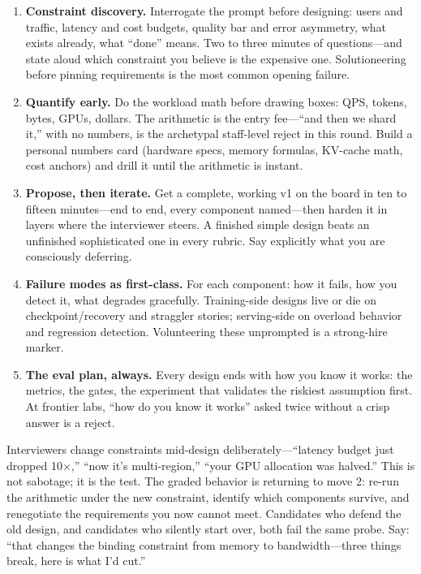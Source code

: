 \begin{enumerate}
    \item \textbf{Constraint discovery.} Interrogate the prompt before designing: users and traffic, latency and cost budgets, quality bar and error asymmetry, what exists already, what ``done'' means. Two to three minutes of questions---and state aloud which constraint you believe is the expensive one. Solutioneering before pinning requirements is the most common opening failure.
    \item \textbf{Quantify early.} Do the workload math before drawing boxes: QPS, tokens, bytes, GPUs, dollars. The arithmetic is the entry fee---``and then we shard it,'' with no numbers, is the archetypal staff-level reject in this round. Build a personal numbers card (hardware specs, memory formulas, KV-cache math, cost anchors) and drill it until the arithmetic is instant.
    \item \textbf{Propose, then iterate.} Get a complete, working v1 on the board in ten to fifteen minutes---end to end, every component named---then harden it in layers where the interviewer steers. A finished simple design beats an unfinished sophisticated one in every rubric. Say explicitly what you are consciously deferring.
    \item \textbf{Failure modes as first-class.} For each component: how it fails, how you detect it, what degrades gracefully. Training-side designs live or die on checkpoint/recovery and straggler stories; serving-side on overload behavior and regression detection. Volunteering these unprompted is a strong-hire marker.
    \item \textbf{The eval plan, always.} Every design ends with how you know it works: the metrics, the gates, the experiment that validates the riskiest assumption first. At frontier labs, ``how do you know it works'' asked twice without a crisp answer is a reject.
\end{enumerate}

\begin{keyinsight}
Interviewers change constraints mid-design deliberately---``latency budget just dropped 10$\times$,'' ``now it's multi-region,'' ``your GPU allocation was halved.'' This is not sabotage; it is the test. The graded behavior is returning to move 2: re-run the arithmetic under the new constraint, identify which components survive, and renegotiate the requirements you now cannot meet. Candidates who defend the old design, and candidates who silently start over, both fail the same probe. Say: ``that changes the binding constraint from memory to bandwidth---three things break, here is what I'd cut.''
\end{keyinsight}

